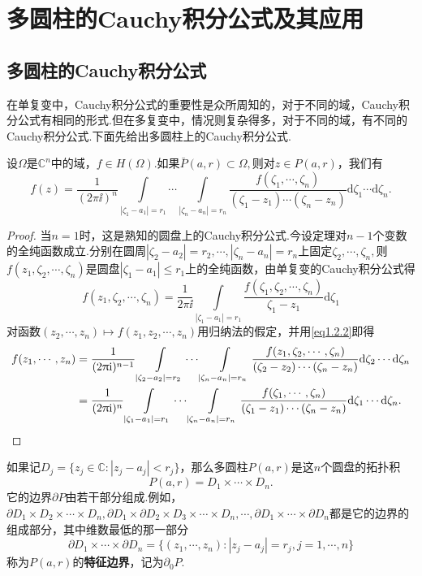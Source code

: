 \section{多圆柱的Cauchy积分公式及其应用\label{sec1.2}}
\subsection{多圆柱的Cauchy积分公式}
在单复变中，Cauchy积分公式的重要性是众所周知的，对于不同的域，Cauchy积分公式有相同的形式.但在多复变中，情况则复杂得多，对于不同的域，有不同的Cauchy积分公式.下面先给出多圆柱上的Cauchy积分公式.
\begin{theorem}\label{thm1.2.1}
	设$\Omega$是$\mathbb{C}^n$中的域，$f\in H(\Omega)$.如果$\bar{P}(a,r)\subset\Omega,$则对$z\in P(a,r)$，我们有
	\begin{equation}\label{eq1.2.1}
		f(z)=\frac1{(2\pi \ii)^n}\int\limits_{|\zeta_1-a_1|=r_1}\cdots\int\limits_{|\zeta_n-a_n|=r_n}\frac{f(\zeta_1,\cdots,\zeta_n)}{(\zeta_1-z_1)\cdots(\zeta_n-z_n)}\mathrm{d}\zeta_1\cdots\mathrm{d}\zeta_n.
	\end{equation}
\end{theorem}

\begin{proof}
	当$n=1$时，这是熟知的圆盘上的Cauchy积分公式.今设定理对$n-1$个变数的全纯函数成立.分别在圆周$|\zeta_2-a_2|=r_2,\cdots,|\zeta_n-a_n|=r_n$上固定$\zeta_2,\cdots,\zeta_n,$则$f(z_1,\zeta_2,\cdots,\zeta_n)$是圆盘$|\zeta_1-a_1|\le r_1$上的全纯函数，由单复变的Cauchy积分公式得
	\begin{equation}\label{eq1.2.2}
		f(z_1,\zeta_2,\cdots,\zeta_n)=\frac1{2\pi\ii}\int\limits_{|\zeta_1-a_1|=r_1}\frac{f(\zeta_1,\zeta_2,\cdots,\zeta_n)}{\zeta_1-z_1}\mathrm{d}\zeta_1
	\end{equation}
对函数$(z_2,\cdots,z_n)\mapsto f(z_1,z_2,\cdots,z_n)$用归纳法的假定，并用\eqref{eq1.2.2}即得
\begin{align*}
	f(z_1,\cdots,z_n)
	&=\frac1{(2\uppi\mathrm i)^{n-1}}\int\limits_{|\zeta_2-a_2|=r_2}\cdots\int\limits_{|\zeta_n-a_n|=r_n}\frac{f(z_1,\zeta_2,\cdots,\zeta_n)}{(\zeta_2-z_2)\cdots(\zeta_n-z_n)}\mathrm{d}\zeta_2\cdots\mathrm{d}\zeta_n\\
	&=\frac1{(2\uppi\mathrm i)^n}\int\limits_{|\zeta_1-a_1|=r_1}\cdots\int\limits_{|\zeta_n-a_n|=r_n}\frac{f(\zeta_1,\cdots,\zeta_n)}{(\zeta_1-z_1)\cdots(\zeta_n-z_n)}\mathrm{d}\zeta_1\cdots\mathrm{d}\zeta_n.\qedhere
\end{align*}
\end{proof}
如果记$D_j=\{z_j\in\mathbb{C}\colon|z_j-a_j|<r_j\}$，那么多圆柱$P(a,r)$是这$n$个圆盘的拓扑积
\[P(a,r)=D_1\times\cdots\times D_n.\]
它的边界$\partial P$由若干部分组成.例如，$\partial D_1\times D_2\times\cdots\times D_n,\partial D_1\times\partial D_2\times D_3\times\cdots\times D_n,\cdots,\partial D_1\times\cdots\times\partial D_n$都是它的边界的组成部分，其中维数最低的那一部分
\[\partial D_1\times\cdots\times\partial D_n=\{(z_1,\cdots,z_n)\colon |z_j-a_j|=r_j,j=1,\cdots,n\}\]
称为$P(a,r)$的\textbf{特征边界}，记为$\partial_0 P$.

